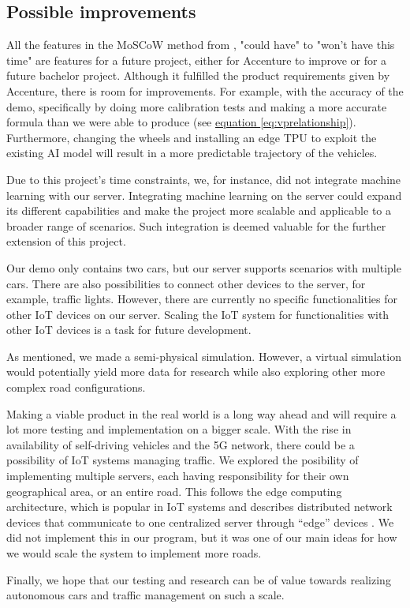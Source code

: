 \subsection{Possible improvements}
All the features in the MoSCoW method from , "could have" to "won't have this time" are features for a future project, either for Accenture to improve or for a future bachelor project. Although it fulfilled the product requirements given by Accenture, there is room for improvements. For example, with the accuracy of the demo, specifically by doing more calibration tests and making a more accurate formula than we were able to produce (see \hyperref[eq:vprelationship]{equation \eqref{eq:vprelationship}}). Furthermore, changing the wheels and installing an edge TPU to exploit the existing AI model will result in a more predictable trajectory of the vehicles.

Due to this project's time constraints, we, for instance, did not integrate machine learning with our server. Integrating machine learning on the server could expand its different capabilities and make the project more scalable and applicable to a broader range of scenarios. Such integration is deemed valuable for the further extension of this project.

Our demo only contains two cars, but our server supports scenarios with multiple cars. There are also possibilities to connect other devices to the server, for example, traffic lights. However, there are currently no specific functionalities for other IoT devices on our server. Scaling the IoT system for functionalities with other IoT devices is a task for future development.

As mentioned, we made a semi-physical simulation. However, a virtual simulation would potentially yield more data for research while also exploring other more complex road configurations.

Making a viable product in the real world is a long way ahead and will require a lot more testing and implementation on a bigger scale. With the rise in availability of self-driving vehicles and the 5G network, there could be a possibility of IoT systems managing traffic. We explored the posibility of implementing multiple servers, each  having responsibility for their own geographical area, or an entire road. This follows the edge computing architecture, which is popular in IoT systems and describes distributed network devices that communicate to one centralized server through ``edge'' devices \parencite[pp 149]{iot_platforms}. We did not implement this in our program, but it was one of our main ideas for how we would scale the system to implement more roads.

Finally, we hope that our testing and research can be of value towards realizing autonomous cars and traffic management on such a scale.